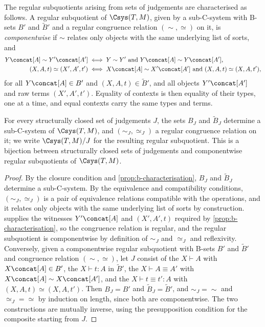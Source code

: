 The regular subquotients arising from sets of judgements are characterised as follows. A regular subquotient of $\Csys(T, M)$, given by a sub-C-system with B-sets $B'$ and $\widetilde{B}'$ and a regular congruence relation $(\sim, \simeq)$ on it, is \emph{componentwise} if $\sim$ relates only objects with the same underlying list of sorts, and
\begin{align*}
    Y \concat [A] \sim Y' \concat [A'] &\iff Y \sim Y' \text{ and } Y \concat [A] \sim Y \concat [A'],\\
    (X, A, t) \simeq (X', A', t') &\iff X \concat [A] \sim X' \concat [A'] \text{ and } (X, A, t) \simeq (X, A, t'),
\end{align*}
for all $Y \concat [A] \in B'$ and $(X, A, t) \in \widetilde{B}'$, and all objects $Y' \concat [A']$ and raw terms $(X', A', t')$. Equality of contexts is then equality of their types, one at a time, and equal contexts carry the same types and terms.

\begin{proposition}\label{prop:structural-subquotient}
    For every structurally closed set of judgements $J$, the sets $B_J$ and $\widetilde{B}_J$ determine a sub-C-system of $\Csys(T, M)$, and $(\sim_J, \simeq_J)$ a regular congruence relation on it; we write $\Csys(T, M)/J$ for the resulting regular subquotient. This is a bijection between structurally closed sets of judgements and componentwise regular subquotients of $\Csys(T, M)$.
\end{proposition}

\begin{proof}
    By the closure condition and \cref{prop:b-characterisation}, $B_J$ and $\widetilde{B}_J$ determine a sub-C-system. By the equivalence and compatibility conditions, $(\sim_J, \simeq_J)$ is a pair of equivalence relations compatible with the operations, and it relates only objects with the same underlying list of sorts by construction.  supplies the witnesses $Y' \concat [A]$ and $(X', A', t)$ required by \cref{prop:b-characterisation}, so the congruence relation is regular, and the regular subquotient is componentwise by definition of $\sim_J$ and $\simeq_J$ and reflexivity. Conversely, given a componentwise regular subquotient with B-sets $B'$ and $\widetilde{B}'$ and congruence relation $(\sim, \simeq)$, let $J$ consist of the $X \vdash A$ with $X \concat [A] \in B'$, the $X \vdash t : A$ in $\widetilde{B}'$, the $X \vdash A \equiv A'$ with $X \concat [A] \sim X \concat [A']$, and the $X \vdash t \equiv t' : A$ with $(X, A, t) \simeq (X, A, t')$. Then $B_J = B'$ and $\widetilde{B}_J = \widetilde{B}'$, and $\sim_J = \sim$ and $\simeq_J = \simeq$ by induction on length, since both are componentwise. The two constructions are mutually inverse, using the presupposition condition for the composite starting from $J$.
\end{proof}

